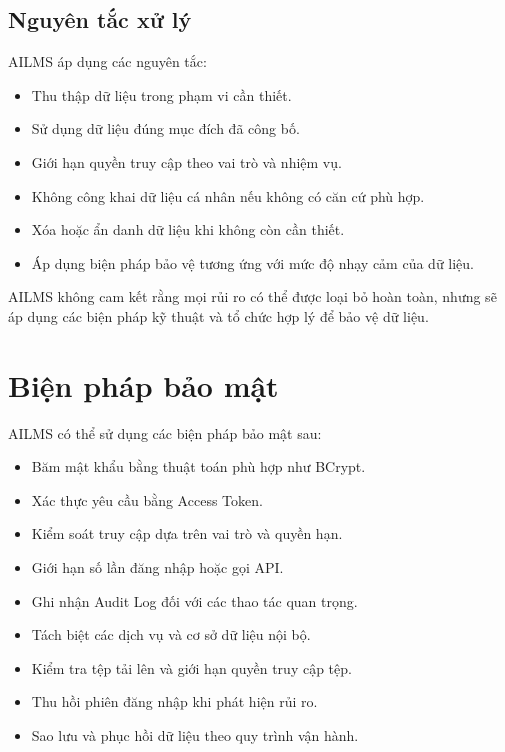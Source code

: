 \documentclass[12pt,a4paper]{article}
\begin{document}
\subsection{Nguyên tắc xử lý}

AILMS áp dụng các nguyên tắc:

\begin{itemize}
    \item Thu thập dữ liệu trong phạm vi cần thiết.
    \item Sử dụng dữ liệu đúng mục đích đã công bố.
    \item Giới hạn quyền truy cập theo vai trò và nhiệm vụ.
    \item Không công khai dữ liệu cá nhân nếu không có căn cứ phù hợp.
    \item Xóa hoặc ẩn danh dữ liệu khi không còn cần thiết.
    \item Áp dụng biện pháp bảo vệ tương ứng với mức độ nhạy cảm của dữ liệu.
\end{itemize}

AILMS không cam kết rằng mọi rủi ro có thể được loại bỏ hoàn toàn,
nhưng sẽ áp dụng các biện pháp kỹ thuật và tổ chức hợp lý để bảo vệ dữ liệu.

\section{Biện pháp bảo mật}

AILMS có thể sử dụng các biện pháp bảo mật sau:

\begin{itemize}
    \item Băm mật khẩu bằng thuật toán phù hợp như BCrypt.
    \item Xác thực yêu cầu bằng Access Token.
    \item Kiểm soát truy cập dựa trên vai trò và quyền hạn.
    \item Giới hạn số lần đăng nhập hoặc gọi API.
    \item Ghi nhận Audit Log đối với các thao tác quan trọng.
    \item Tách biệt các dịch vụ và cơ sở dữ liệu nội bộ.
    \item Kiểm tra tệp tải lên và giới hạn quyền truy cập tệp.
    \item Thu hồi phiên đăng nhập khi phát hiện rủi ro.
    \item Sao lưu và phục hồi dữ liệu theo quy trình vận hành.
\end{itemize}
\end{document}
